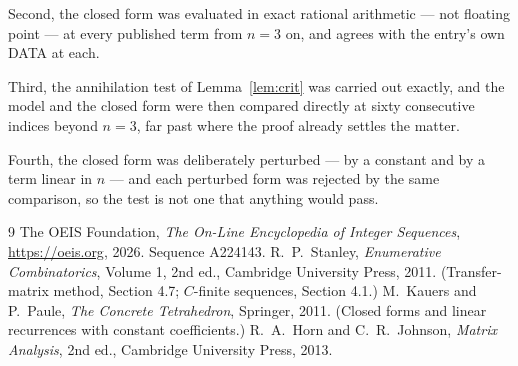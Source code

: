 \documentclass[11pt,a4paper]{article}
\theoremstyle{plain}
\theoremstyle{definition}
\begin{document}
Second, the closed form was evaluated in exact rational arithmetic --- not floating point ---
at every published term from $n=3$ on, and agrees with the entry's own DATA at each.

Third, the annihilation test of Lemma~\ref{lem:crit} was carried out exactly, and the model
and the closed form were then compared directly at sixty consecutive indices beyond
$n=3$, far past where the proof already settles the matter.

Fourth, the closed form was deliberately perturbed --- by a constant and by a term linear in
$n$ --- and each perturbed form was rejected by the same comparison, so the test is not one
that anything would pass.

\begin{thebibliography}{9}
 The OEIS Foundation, \emph{The On-Line Encyclopedia of Integer
Sequences}, \url{https://oeis.org}, 2026. Sequence A224143.
 R.~P.~Stanley, \emph{Enumerative Combinatorics}, Volume 1, 2nd ed.,
Cambridge University Press, 2011. (Transfer-matrix method, Section 4.7; $C$-finite sequences,
Section 4.1.)
 M.~Kauers and P.~Paule, \emph{The Concrete Tetrahedron}, Springer, 2011.
(Closed forms and linear recurrences with constant coefficients.)
 R.~A.~Horn and C.~R.~Johnson, \emph{Matrix Analysis}, 2nd ed., Cambridge
University Press, 2013.
\end{thebibliography}
\end{document}
